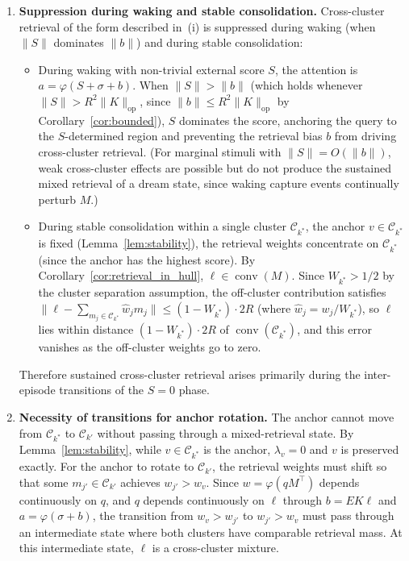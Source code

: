 \begin{theorem}
\begin{enumerate}
\item \textbf{Suppression during waking and stable consolidation.}  Cross-cluster retrieval of the form described in~(i) is suppressed during waking (when $\|S\|$ dominates $\|b\|$) and during stable consolidation:
\begin{itemize}
\item During waking with non-trivial external score $S$, the attention is $a = \varphi(S + \sigma + b)$.  When $\|S\| > \|b\|$ (which holds whenever $\|S\| > R^2\|K\|_{\mathrm{op}}$, since $\|b\| \leq R^2\|K\|_{\mathrm{op}}$ by Corollary~\ref{cor:bounded}), $S$ dominates the score, anchoring the query to the $S$-determined region and preventing the retrieval bias $b$ from driving cross-cluster retrieval.  (For marginal stimuli with $\|S\| = O(\|b\|)$, weak cross-cluster effects are possible but do not produce the sustained mixed retrieval of a dream state, since waking capture events continually perturb $M$.)
\item During stable consolidation within a single cluster $\mathcal{C}_{k^*}$, the anchor $v \in \mathcal{C}_{k^*}$ is fixed (Lemma~\ref{lem:stability}), the retrieval weights concentrate on $\mathcal{C}_{k^*}$ (since the anchor has the highest score).  By Corollary~\ref{cor:retrieval_in_hull}, $\ell \in \operatorname{conv}(M)$.  Since $W_{k^*} > 1/2$ by the cluster separation assumption, the off-cluster contribution satisfies $\|\ell - \sum_{m_j \in \mathcal{C}_{k^*}} \hat{w}_j m_j\| \leq (1 - W_{k^*}) \cdot 2R$ (where $\hat{w}_j = w_j / W_{k^*}$), so $\ell$ lies within distance $(1 - W_{k^*}) \cdot 2R$ of $\operatorname{conv}(\mathcal{C}_{k^*})$, and this error vanishes as the off-cluster weights go to zero.
\end{itemize}
Therefore sustained cross-cluster retrieval arises primarily during the inter-episode transitions of the $S = 0$ phase.

\item \textbf{Necessity of transitions for anchor rotation.}  The anchor cannot move from $\mathcal{C}_{k^*}$ to $\mathcal{C}_{k'}$ without passing through a mixed-retrieval state.  By Lemma~\ref{lem:stability}, while $v \in \mathcal{C}_{k^*}$ is the anchor, $\lambda_v = 0$ and $v$ is preserved exactly.  For the anchor to rotate to $\mathcal{C}_{k'}$, the retrieval weights must shift so that some $m_{j'} \in \mathcal{C}_{k'}$ achieves $w_{j'} > w_v$.  Since $w = \varphi(qM^\top)$ depends continuously on $q$, and $q$ depends continuously on $\ell$ through $b = EK\ell$ and $a = \varphi(\sigma + b)$, the transition from $w_v > w_{j'}$ to $w_{j'} > w_v$ must pass through an intermediate state where both clusters have comparable retrieval mass.  At this intermediate state, $\ell$ is a cross-cluster mixture.


\end{enumerate}
\end{theorem}
